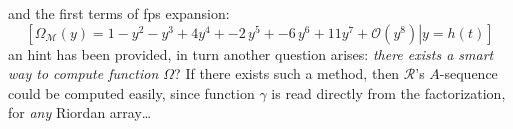 and the first terms of fps expansion:
\begin{displaymath}
        \left.\left[
            \Omega_{\mathcal{M}}(y) = 1 -y^{2} -y^{3} + 4 y^{4} + -2\,y^{5} 
                + -6\,y^{6} + 11 y^{7}+\mathcal{O}\left(y^{8}\right)
                \right| y = h(t) \right]
\end{displaymath}
an hint has been provided, in turn another question arises: \emph{there
exists a smart way to compute function $\Omega$}? If there exists such a method, then
$\mathcal{R}$'s $A$-sequence could be computed easily, since function $\gamma$ 
is read directly from the factorization, for \emph{any} Riordan array\ldots
